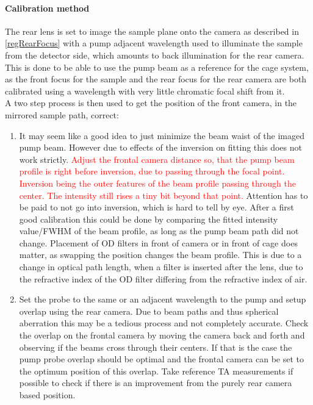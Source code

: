 \documentclass[twoside,openright]{scrreprt}
\begin{document}
\paragraph{Calibration method}
The rear lens is set to image the sample plane onto the camera as described in \ref{regRearFocus} with a pump adjacent wavelength used to illuminate the sample from the detector side, which amounts to back illumination for the rear camera. This is done to be able to use the pump beam as a reference for the cage system, as the front focus for the sample and the rear focus for the rear camera are both calibrated using a wavelength with very little chromatic focal shift from it.\\
A two step process is then used to get the position of the front camera, in the mirrored sample path, correct:
\begin{enumerate}
\item It may seem like a good idea to just minimize the beam waist of the imaged pump beam. However due to effects of the inversion on fitting this does not work strictly. \textcolor{red}{Adjust the frontal camera distance so, that the pump beam profile is right before inversion, due to passing through the focal point. Inversion being the outer features of the beam profile passing through the center. The intensity still rises a tiny bit beyond that point.} Attention has to be paid to not go into inversion, which is hard to tell by eye. After a first good calibration this could be done by comparing the fitted intensity value/FWHM of the beam profile, as long as the pump beam path did not change. Placement of OD filters in front of camera or in front of cage does matter, as swapping the position changes the beam profile. This is due to a change in optical path length, when a filter is inserted after the lens, due to the refractive index of the OD filter differing from the refractive index of air.
\item Set the probe to the same or an adjacent wavelength to the pump and setup overlap using the rear camera. Due to beam paths and thus spherical aberration this may be a tedious process and not completely accurate. Check the overlap on the frontal camera by moving the camera back and forth and observing if the beams cross through their centers. If that is the case the pump probe overlap should be optimal and the frontal camera can be set to the optimum position of this overlap. Take reference TA measurements if possible to check if there is an improvement from the purely rear camera based position.
\end{enumerate}
\end{document}
